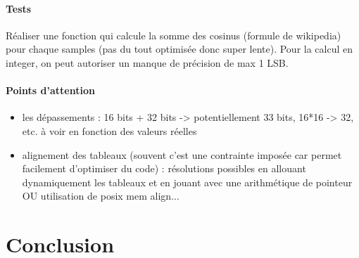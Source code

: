 \documentclass{article}
\begin{document}
    \paragraph{Tests}
    Réaliser une fonction qui calcule la somme des cosinus (formule de wikipedia) pour chaque samples (pas du tout optimisée donc super lente). Pour la calcul en integer, on peut autoriser un manque de précision de max 1 LSB.

    \paragraph{Points d'attention}
    \begin{itemize}
        \item les dépassements : 16 bits + 32 bits -> potentiellement 33 bits, 16*16 -> 32, etc. à voir en fonction des valeurs réelles
        \item alignement des tableaux (souvent c'est une contrainte imposée car permet facilement d'optimiser du code) : résolutions possibles en allouant dynamiquement les tableaux et en jouant avec une arithmétique de pointeur OU utilisation de posix mem align...
    \end{itemize}



    \section*{Conclusion}
    \paragraph{}
\end{document}
